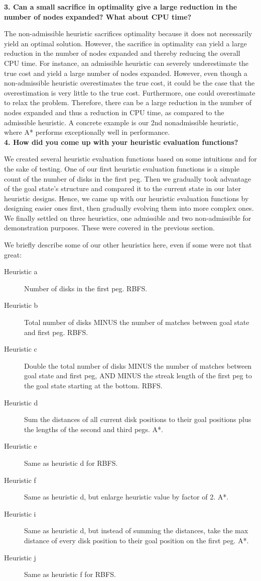 \textbf{3. Can a small sacrifice in optimality give a large reduction in the number of nodes expanded? What about CPU time?}

The non-admissible heuristic sacrifices optimality because it does not necessarily yield an optimal solution. However, the sacrifice in optimality can yield a large reduction in the number of nodes expanded and thereby reducing the overall CPU time. For instance, an admissible heuristic can severely underestimate the true cost and yield a large number of nodes expanded. However, even though a non-admissible heuristic overestimates the true cost, it could be the case that the overestimation is very little to the true cost. Furthermore, one could overestimate to relax the problem. Therefore, there can be a large reduction in the number of nodes expanded and thus a reduction in CPU time, as compared to the admissible heuristic. A concrete example is our 2nd nonadmissible heuristic, where A* performs exceptionally well in performance.\\

\textbf{4. How did you come up with your heuristic evaluation functions?}

We created several heuristic evaluation functions based on some intuitions and for the sake of testing. One of our first heuristic evaluation functions is a simple count of the number of disks in the first peg. Then we gradually took advantage of the goal state's structure and compared it to the current state in our later heuristic designs. Hence, we came up with our heuristic evaluation functions by designing easier ones first, then gradually evolving them into more complex ones. We finally settled on three heuristics, one admissible and two non-admissible for demonstration purposes. These were covered in the previous section. 

We briefly describe some of our other heuristics here, even if some were not that great:

\begin{description}
	\item[Heuristic a] Number of disks in the first peg. RBFS.
	\item[Heuristic b] Total number of disks MINUS the number of matches between goal state and first peg. RBFS.
	\item[Heuristic c] Double the total number of disks MINUS the number of matches between goal state and first peg, AND MINUS the streak length of the first peg to the goal state starting at the bottom. RBFS.
	\item[Heuristic d] Sum the distances of all current disk positions to their goal positions plus the lengths of the second and third pegs. A*.
	\item[Heuristic e] Same as heuristic d for RBFS.
	\item[Heuristic f] Same as heuristic d, but enlarge heuristic value by factor of 2. A*. 
	\item[Heuristic i] Same as heuristic d, but instead of summing the distances, take the max distance of every disk position to their goal position on the first peg. A*.
	\item[Heuristic j] Same as heuristic f for RBFS.
\end{description}

